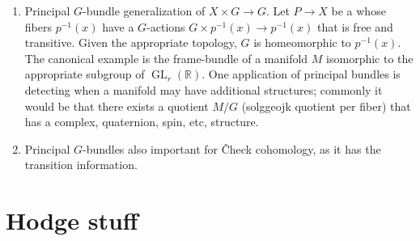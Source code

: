 \documentclass{book}
\newcommand{\R}{{\mathbb{R}}}
\newcommand{\GL}{{\operatorname{GL}}}
\begin{document}
\begin{enumerate}
  \item Principal $G$-bundle generalization of $X\times G \to G$. Let $P \to X$ be a whose fibers $p^{-1}(x)$
    have a $G$-actions $G\times p^{-1}(x) \to p^{-1}(x)$ that is free and transitive. Given the appropriate
    topology, $G$ is homeomorphic to $p^{-1}(x)$. The canonical example is the frame-bundle of a manifold $M$
    isomorphic to the appropriate subgroup of $\GL_r(\R)$. One application of principal bundles is detecting
    when a manifold may have additional structures; commonly it would be that there exists a quotient $M/G$
    (solggeojk quotient per fiber) that has a complex, quaternion, spin, etc, structure.
  \item Principal $G$-bundles also important for \v{C}heck cohomology, as it has the transition
    information.
\end{enumerate}

\section{Hodge stuff}
\end{document}
